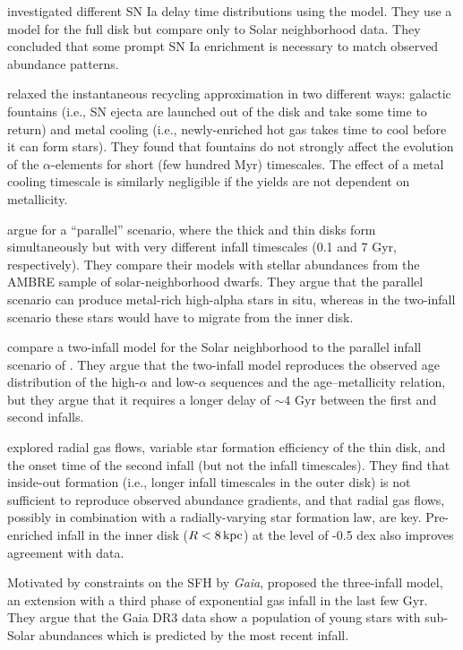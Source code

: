 \citet{matteucci_effect_2009} investigated different SN Ia delay time distributions using the \citep{chiappini_chemical_1997,chiappini_abundance_2001} model. They use a model for the full disk but compare only to Solar neighborhood data. They concluded that some prompt SN Ia enrichment is necessary to match observed abundance patterns.

\citet{spitoni_effects_2009} relaxed the instantaneous recycling approximation in two different ways: galactic fountains (i.e., SN ejecta are launched out of the disk and take some time to return) and metal cooling (i.e., newly-enriched hot gas takes time to cool before it can form stars). They found that fountains do not strongly affect the evolution of the $\alpha$-elements for short (few hundred Myr) timescales. The effect of a metal cooling timescale is similarly negligible if the yields are not dependent on metallicity.

\citet{grisoni_ambre_2017} argue for a ``parallel'' scenario, where the thick and thin disks form simultaneously but with very different infall timescales (0.1 and 7 Gyr, respectively). They compare their models with stellar abundances from the AMBRE sample of solar-neighborhood dwarfs. They argue that the parallel scenario can produce metal-rich high-alpha stars in situ, whereas in the two-infall scenario these stars would have to migrate from the inner disk.

\citet{spitoni_galactic_2019} compare a two-infall model for the Solar neighborhood to the parallel infall scenario of \citet{grisoni_ambre_2017}. They argue that the two-infall model reproduces the observed age distribution of the high-$\alpha$ and low-$\alpha$ sequences and the age--metallicity relation, but they argue that it requires a longer delay of $\sim4$ Gyr between the first and second infalls.

\citet{palla_chemical_2020} explored radial gas flows, variable star formation efficiency of the thin disk, and the onset time of the second infall (but not the infall timescales). They find that inside-out formation (i.e., longer infall timescales in the outer disk) is not sufficient to reproduce observed abundance gradients, and that radial gas flows, possibly in combination with a radially-varying star formation law, are key. Pre-enriched infall in the inner disk ($R<8\,{\rm kpc}$) at the level of -0.5 dex also improves agreement with data.

Motivated by constraints on the SFH by {\it Gaia}, \citet{spitoni_beyond_2023} proposed the three-infall model, an extension with a third phase of exponential gas infall in the last few Gyr. They argue that the Gaia DR3 data show a population of young stars with sub-Solar abundances which is predicted by the most recent infall.

